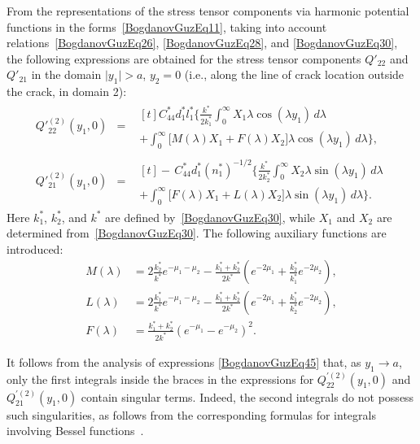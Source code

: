 From the representations of the stress tensor components via harmonic potential functions in the forms~\eqref{BogdanovGuzEq11}, taking into account relations~\eqref{BogdanovGuzEq26}, \eqref{BogdanovGuzEq28}, and \eqref{BogdanovGuzEq30}, the following expressions are obtained for the stress tensor components $Q'_{22}$ and $Q'_{21}$ in the domain $\lvert y_{1}\rvert>a$, $y_{2}=0$ (i.e., along the line of crack location outside the crack, in domain 2):
\begin{equation}\label{BogdanovGuzEq45}
	\begin{array}{rcl}
		Q'^{(2)}_{22}(y_{1},0)
		&=&
		\begin{multlined}[t]
			C_{44}^{*}d_{1}^{*}l_{1}^{*}
			\bigg\{
			\frac{k^{*}}{2k_{1}^{*}}
			\int_{0}^{\infty}X_{1}\lambda\cos(\lambda y_{1})\,d\lambda
			\\[-1em]
			+
			\int_{0}^{\infty}\big[M(\lambda)X_{1}+F(\lambda)X_{2}\big]
			\lambda\cos(\lambda y_{1})\,d\lambda
			\bigg\},
		\end{multlined}
		\\[1em]	
		Q'^{(2)}_{21}(y_{1},0)
		&=&
		\begin{multlined}[t]
			-\,C_{44}^{*}d_{1}^{*}(n_{1}^{*})^{-1/2}
			\bigg\{
			\frac{k^{*}}{2k_{2}^{*}}
			\int_{0}^{\infty}X_{2}\lambda\sin(\lambda y_{1})\,d\lambda
			\\[-1em]
			+
			\int_{0}^{\infty}\big[F(\lambda)X_{1}+L(\lambda)X_{2}\big]
			\lambda\sin(\lambda y_{1})\,d\lambda
			\bigg\}.
		\end{multlined}
	\end{array}
\end{equation}
%
Here $k_{1}^{*}$, $k_{2}^{*}$, and $k^{*}$ are defined by~\eqref{BogdanovGuzEq30}, while $X_{1}$ and $X_{2}$ are determined from~\eqref{BogdanovGuzEq30}. The following auxiliary functions are introduced:
\begin{align*}
M(\lambda)
&=
2\frac{k_{2}^{*}}{k^{*}}e^{-\mu_{1}-\mu_{2}}
-\frac{k_{1}^{*}+k_{2}^{*}}{2k^{*}}
\left(
e^{-2\mu_{1}}
+\frac{k_{2}^{*}}{k_{1}^{*}}e^{-2\mu_{2}}
\right),
\\ 
L(\lambda)
&=
2\frac{k_{1}^{*}}{k^{*}}e^{-\mu_{1}-\mu_{2}}
-\frac{k_{1}^{*}+k_{2}^{*}}{2k^{*}}
\left(
e^{-2\mu_{1}}
+\frac{k_{1}^{*}}{k_{2}^{*}}e^{-2\mu_{2}}
\right),
\\
F(\lambda)
&=
\frac{k_{1}^{*}+k_{2}^{*}}{2k^{*}}
\left(e^{-\mu_{1}}-e^{-\mu_{2}}\right)^{2}.
\end{align*}

It follows from the analysis of expressions \eqref{BogdanovGuzEq45} that, as
$y_{1}\to a$, only the first integrals inside the braces in the expressions for
$Q_{22}^{\prime(2)}(y_{1},0)$ and $Q_{21}^{\prime(2)}(y_{1},0)$ contain
singular terms. Indeed, the second integrals do not possess such singularities,
as follows from the corresponding formulas for integrals involving Bessel
functions~\cite{BogdanovGuz54}.

